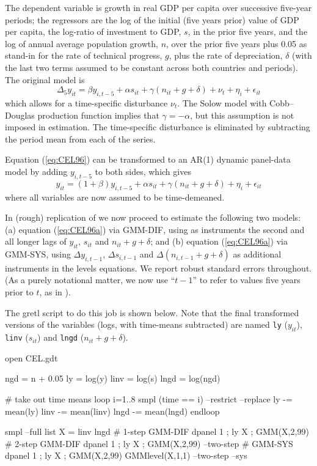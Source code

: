 The dependent variable is growth in real GDP per capita over
successive five-year periods; the regressors are the log of the
initial (five years prior) value of GDP per capita, the log-ratio of
investment to GDP, $s$, in the prior five years, and the log of annual
average population growth, $n$, over the prior five years plus 0.05 as
stand-in for the rate of technical progress, $g$, plus the rate of
depreciation, $\delta$ (with the last two terms assumed to be constant
across both countries and periods).  The original model is
\begin{equation}
\label{eq:CEL96}
\Delta_5 y_{it} = \beta y_{i,t-5} + \alpha s_{it} + \gamma (n_{it} +
g + \delta) + \nu_t + \eta_i + \epsilon_{it}
\end{equation}
which allows for a time-specific disturbance $\nu_t$. The Solow model
with Cobb--Douglas production function implies that $\gamma =
-\alpha$, but this assumption is not imposed in estimation. The
time-specific disturbance is eliminated by subtracting the period mean
from each of the series.

Equation (\ref{eq:CEL96}) can be transformed to an AR(1) dynamic
panel-data model by adding $y_{i,t-5}$ to both sides, which gives
\begin{equation}
\label{eq:CEL96a}
y_{it} = (1 + \beta) y_{i,t-5} + \alpha s_{it} + \gamma (n_{it} +
g + \delta) + \eta_i + \epsilon_{it}
\end{equation}
where all variables are now assumed to be time-demeaned.

In (rough) replication of \cite{Bond2001} we now proceed to estimate
the following two models: (a) equation (\ref{eq:CEL96a}) via GMM-DIF,
using as instruments the second and all longer lags of $y_{it}$,
$s_{it}$ and $n_{it} + g + \delta$; and (b) equation
(\ref{eq:CEL96a}) via GMM-SYS, using $\Delta y_{i,t-1}$, $\Delta
s_{i,t-1}$ and $\Delta (n_{i,t-1} + g + \delta)$ as additional
instruments in the levels equations. We report robust standard errors
throughout. (As a purely notational matter, we now use ``$t-1$'' to
refer to values five years prior to $t$, as in \cite{Bond2001}).

The gretl script to do this job is shown below. Note that the final
transformed versions of the variables (logs, with time-means
subtracted) are named \texttt{ly} ($y_{it}$), \texttt{linv} ($s_{it}$)
and \texttt{lngd} ($n_{it} + g + \delta$).
%
\begin{code}
open CEL.gdt

ngd = n + 0.05
ly = log(y)
linv = log(s)
lngd = log(ngd)

# take out time means
loop i=1..8
  smpl (time == i) --restrict --replace
  ly -= mean(ly)
  linv -= mean(linv)
  lngd -= mean(lngd)
endloop

smpl --full
list X = linv lngd
# 1-step GMM-DIF
dpanel 1 ; ly X ; GMM(X,2,99)
# 2-step GMM-DIF
dpanel 1 ; ly X ; GMM(X,2,99) --two-step
# GMM-SYS
dpanel 1 ; ly X ; GMM(X,2,99) GMMlevel(X,1,1) --two-step --sys
\end{code}

